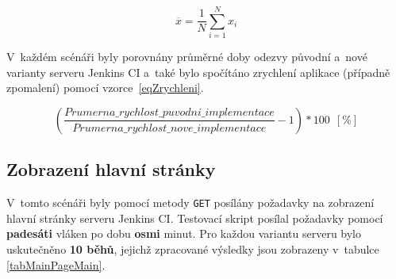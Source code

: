             \begin{equation}\label{eqPrumer}
                \overline{x} = \frac{1}{N}\sum_{i=1}^Nx_i
            \end{equation}
            \medskip

            V~každém scénáři byly porovnány průměrné doby odezvy původní a~nové
            varianty serveru Jenkins CI a~také bylo spočítáno zrychlení aplikace (případně zpomalení) pomocí vzorce~\ref{eqZrychleni}.

            \begin{equation}\label{eqZrychleni}
                \left(\frac{Prumerna\_rychlost\_puvodni\_implementace}{Prumerna\_rychlost\_nove\_implementace} - 1\right)* 100 ~~ [\%]
            \end{equation}
            \medskip


        \subsection{Zobrazení hlavní stránky}
            V~tomto scénáři byly pomocí metody \texttt{GET} posílány požadavky na zobrazení hlavní 
            stránky serveru Jenkins CI. Testovací skript posílal požadavky pomocí \textbf{padesáti} vláken po dobu \textbf{osmi} minut.
            Pro každou variantu serveru bylo uskutečněno \textbf{10 běhů}, 
            jejichž zpracované výsledky jsou zobrazeny v~tabulce \ref{tabMainPageMain}.


